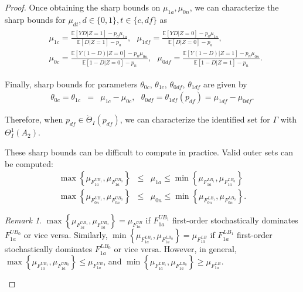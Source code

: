 \documentclass[12pt]{article}
\theoremstyle{plain}
\theoremstyle{definition}
\theoremstyle{remark}
\newtheorem{remark}{Remark}%
\begin{document}
\begin{proof}
Once obtaining the sharp bounds on $\mu_{1a}, \mu_{0n}$, we can characterize the sharp bounds for $\mu_{dt}, d \in \{0, 1\}, t \in \{c, df\}$ as
\begin{eqnarray*}
\begin{aligned}
& \mu_{1 c} = \frac{\mathbb{E}[Y D  \vert  Z=1]-p_a \mu_{1 a}}{\mathbb{E}[D  \vert  Z=1]-p_a},\ \ \ \mu_{1 d f} = \frac{\mathbb{E}[Y D  \vert  Z=0]-p_a \mu_{1 a}}{\mathbb{E}[D  \vert  Z=0]-p_a}, \\
& \mu_{0 c} = \frac{\mathbb{E}[Y(1-D)  \vert  Z=0]-p_n \mu_{0 n}}{\mathbb{E}[1-D  \vert  Z=0]-p_n},\ \ \ \mu_{0 d f} = \frac{\mathbb{E}[Y(1-D)  \vert  Z=1]-p_n \mu_{0 n}}{\mathbb{E}[1-D  \vert  Z=1]-p_n}.
\end{aligned}
\end{eqnarray*}

Finally, sharp bounds for parameters $\theta_{0c}$, $\theta_{1c}$, $\theta_{0df}$, $\theta_{1df}$ are given by
\begin{eqnarray*}
    \theta_{0c}=\theta_{1c}&=& \mu_{1c}-\mu_{0c},\ \ \ \theta_{0df}=\theta_{1df}(p_{df})= \mu_{1df}-\mu_{0df}.
\end{eqnarray*}

Therefore, when $p_{df} \in \mathring{\Theta}_I(p_{df})$, we can characterize the identified set for $\Gamma$ with $\Theta_I^1(A_2)$.

These sharp bounds can be difficult to compute in practice. Valid outer sets can be computed:
\begin{eqnarray*}
    \max\left\{\mu_{F_{1a}^{UB_1}}, \mu_{F_{1a}^{UB_0}}\right\} &\leq& \mu_{1a} \leq \min\left\{\mu_{F_{1a}^{LB_1}}, \mu_{F_{1a}^{LB_0}}\right\}\\
    \max\left\{\mu_{F_{0n}^{UB_1}}, \mu_{F_{0n}^{UB_0}}\right\} &\leq& \mu_{0n} \leq \min\left\{\mu_{F_{0n}^{LB_1}}, \mu_{F_{0n}^{LB_0}}\right\}.
\end{eqnarray*}

\begin{remark}
    $\max\left\{\mu_{F_{1a}^{UB_1}}, \mu_{F_{1a}^{UB_0}}\right\}=\mu_{F_{1a}^{UB}}$ if $F_{1a}^{UB_1}$ first-order stochastically dominates $F_{1a}^{UB_0}$ or vice versa. Similarly, $\min\left\{\mu_{F_{1a}^{LB_1}}, \mu_{F_{1a}^{LB_0}}\right\}=\mu_{F_{1a}^{LB}}$ if $F_{1a}^{LB_1}$ first-order stochastically dominates $F_{1a}^{LB_0}$ or vice versa. However, in general, 
    $\max\left\{\mu_{F_{1a}^{UB_1}}, \mu_{F_{1a}^{UB_0}}\right\} \leq \mu_{F_{1a}^{UB}}$, and $\min\left\{\mu_{F_{1a}^{LB_1}}, \mu_{F_{1a}^{LB_0}}\right\}\geq \mu_{F_{1a}^{LB}}$. 
\end{remark}


\end{proof}
\end{document}
